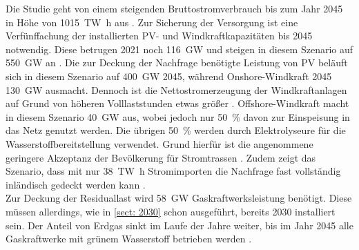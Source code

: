 		Die Studie geht von einem steigenden Bruttostromverbrauch bis zum Jahr 2045 in Höhe von \SI{1015}{\tera\watt\hour} aus \cite[S.10]{ESRa_Fraunhofer}. 
		Zur Sicherung der Versorgung ist eine Verfünffachung der installierten PV- und Windkraftkapazitäten bis 2045 notwendig. 
		Diese betrugen 2021 noch \SI{116}{\giga\watt} und steigen in diesem Szenario auf \SI{550}{\giga\watt} an \cite[S.7]{ESRa_Fraunhofer}.
		Die zur Deckung der Nachfrage benötigte Leistung von PV beläuft sich in diesem Szenario auf \SI{400}{\giga\watt} 2045, während Onshore-Windkraft 2045 \SI{130}{\giga\watt} ausmacht. 
		Dennoch ist die Nettostromerzeugung der Windkraftanlagen auf Grund von höheren Volllaststunden etwas größer \cite[S.7]{ESRa_Fraunhofer}. 
		Offshore-Windkraft macht in diesem Szenario \SI{40}{\giga\watt} aus, wobei jedoch nur \SI{50}{\percent} davon zur Einspeisung in das Netz genutzt werden. 
		Die übrigen \SI{50}{\percent} werden durch Elektrolyseure für die Wasserstoffbereitstellung verwendet. 
		Grund hierfür ist die angenommene geringere Akzeptanz der Bevölkerung für Stromtrassen \cite[S.7]{ESRa_Fraunhofer}. 
		Zudem zeigt das Szenario, dass mit nur \SI{38}{\tera\watt\hour} Stromimporten die Nachfrage fast vollständig inländisch gedeckt werden kann \cite[S.16]{ESRa_Fraunhofer}. \\
		
		Zur Deckung der Residuallast wird \SI{58}{\giga\watt} Gaskraftwerksleistung benötigt.
		Diese müssen allerdings, wie in \ref{sect: 2030} schon ausgeführt, bereits 2030 installiert sein. 
		Der Anteil von Erdgas sinkt im Laufe der Jahre weiter, bis im Jahr 2045 alle Gaskraftwerke mit grünem Wasserstoff betrieben werden \cite[S.8]{ESRa_Fraunhofer}. 
		

